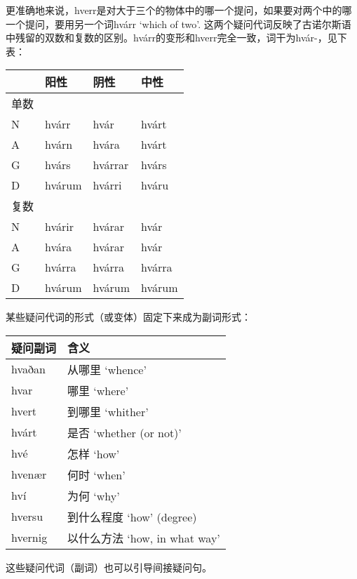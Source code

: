 更准确地来说，hverr是对大于三个的物体中的哪一个提问，如果要对两个中的哪一个提问，要用另一个词hvárr
`which of two‌'.
这两个疑问代词反映了古诺尔斯语中残留的双数和复数的区别。hvárr的变形和hverr完全一致，词干为hvár-，见下表：

\begin{longtable}{llll}
  \toprule
       & 阳性   & 阴性    & 中性   \\
  \midrule
  \endhead
  \bottomrule
  \endfoot
  单数 &        &         &        \\
  N    & hvárr  & hvár    & hvárt  \\
  A    & hvárn  & hvára   & hvárt  \\
  G    & hvárs  & hvárrar & hvárs  \\
  D    & hvárum & hvárri  & hváru  \\
  复数 &        &         &        \\
  N    & hvárir & hvárar  & hvár   \\
  A    & hvára  & hvárar  & hvár   \\
  G    & hvárra & hvárra  & hvárra \\
  D    & hvárum & hvárum  & hvárum \\
\end{longtable}

某些疑问代词的形式（或变体）固定下来成为副词形式：

\begin{longtable}{ll}
  \toprule
  疑问副词 & 含义                          \\
  \midrule
  \endhead
  \bottomrule
  \endfoot
  hvaðan   & 从哪里 `whence‌'               \\
  hvar     & 哪里 `where‌'                  \\
  hvert    & 到哪里 `whither‌'              \\
  hvárt    & 是否 `whether (or not)‌'       \\
  hvé      & 怎样 `how‌'                    \\
  hvenær   & 何时 `when‌'                   \\
  hví      & 为何 `why‌'                    \\
  hversu   & 到什么程度 `how‌' (degree)     \\
  hvernig  & 以什么方法 `how, in what way‌' \\
\end{longtable}

这些疑问代词（副词）也可以引导间接疑问句。

